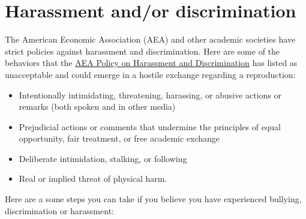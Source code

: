 \documentclass[
  openany]{book}
\providecommand{\tightlist}{%
  \setlength{\itemsep}{0pt}\setlength{\parskip}{0pt}}
\begin{document}
\hypertarget{harassment-andor-discrimination}{%
\section{Harassment and/or discrimination}\label{harassment-andor-discrimination}}

The American Economic Association (AEA) and other academic societies have strict policies against harassment and discrimination. Here are some of the behaviors that the \href{https://www.aeaweb.org/about-aea/aea-policy-harassment-discrimination}{AEA Policy on Harassment and Discrimination} has listed as unacceptable and could emerge in a hostile exchange regarding a reproduction:

\begin{itemize}
\tightlist
\item
  Intentionally intimidating, threatening, harassing, or abusive actions or remarks (both spoken and in other media)
\item
  Prejudicial actions or comments that undermine the principles of equal opportunity, fair treatment, or free academic exchange
\item
  Deliberate intimidation, stalking, or following
\item
  Real or implied threat of physical harm.
\end{itemize}

Here are a some steps you can take if you believe you have experienced bullying, discrimination or harassment:
\end{document}
